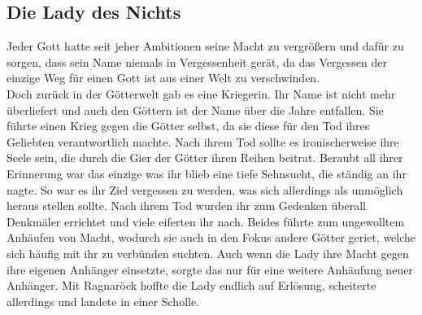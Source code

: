 \documentclass[a4paper,12pt,oneside]{book}
\begin{document}
\subsection{Die Lady des Nichts}
Jeder Gott hatte seit jeher Ambitionen seine Macht zu vergrößern und dafür zu sorgen, dass sein Name niemals in Vergessenheit gerät, da das Vergessen der einzige Weg für einen Gott ist aus einer Welt zu verschwinden.
\\Doch zurück in der Götterwelt gab es eine Kriegerin. Ihr Name ist nicht mehr überliefert und auch den Göttern ist der Name über die Jahre entfallen. Sie führte einen Krieg gegen die Götter selbst, da sie diese für den Tod ihres Geliebten verantwortlich machte. Nach ihrem Tod sollte es ironischerweise ihre Seele sein, die durch die Gier der Götter ihren Reihen beitrat. Beraubt all ihrer Erinnerung war das einzige was ihr blieb eine tiefe Sehnsucht, die ständig an ihr nagte. So war es ihr Ziel vergessen zu werden, was sich allerdings als unmöglich heraus stellen sollte. Nach ihrem Tod wurden ihr zum Gedenken überall Denkmäler errichtet und viele eiferten ihr nach. Beides führte zum ungewolltem Anhäufen von Macht, wodurch sie auch in den Fokus andere Götter geriet, welche sich häufig mit ihr zu verbünden suchten. Auch wenn die Lady ihre Macht gegen ihre eigenen Anhänger einsetzte, sorgte das nur für eine weitere Anhäufung neuer Anhänger. Mit Ragnaröck hoffte die Lady endlich auf Erlösung, scheiterte allerdings und landete in einer Scholle.
\end{document}
